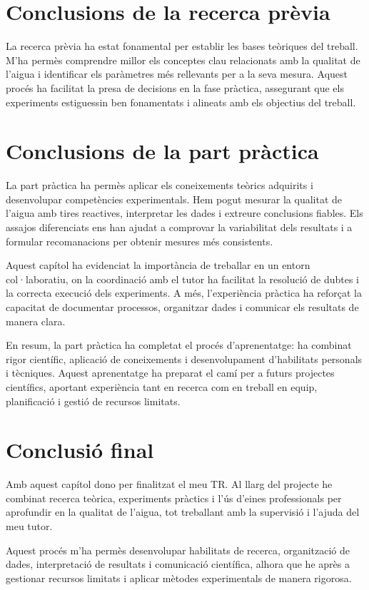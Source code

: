 \section{Conclusions de la recerca prèvia}

La recerca prèvia ha estat fonamental per establir les bases teòriques del treball. M'ha permès comprendre millor els conceptes clau relacionats amb la qualitat de l’aigua i identificar els paràmetres més rellevants per a la seva mesura. Aquest procés ha facilitat la presa de decisions en la fase pràctica, assegurant que els experiments estiguessin ben fonamentats i alineats amb els objectius del treball.



\section{Conclusions de la part pràctica}

La part pràctica ha permès aplicar els coneixements teòrics adquirits i desenvolupar competències experimentals. Hem pogut mesurar la qualitat de l’aigua amb tires reactives, interpretar les dades i extreure conclusions fiables. Els assajos diferenciats ens han ajudat a comprovar la variabilitat dels resultats i a formular recomanacions per obtenir mesures més consistents.

Aquest capítol ha evidenciat la importància de treballar en un entorn col·laboratiu, on la coordinació amb el tutor ha facilitat la resolució de dubtes i la correcta execució dels experiments. A més, l’experiència pràctica ha reforçat la capacitat de documentar processos, organitzar dades i comunicar els resultats de manera clara.

En resum, la part pràctica ha completat el procés d’aprenentatge: ha combinat rigor científic, aplicació de coneixements i desenvolupament d’habilitats personals i tècniques. Aquest aprenentatge ha preparat el camí per a futurs projectes científics, aportant experiència tant en recerca com en treball en equip, planificació i gestió de recursos limitats.

\section{Conclusió final}
Amb aquest capítol dono per finalitzat el meu TR. Al llarg del projecte he combinat recerca teòrica, experiments pràctics i l’ús d’eines professionals per aprofundir en la qualitat de l’aigua, tot treballant amb la supervisió i l’ajuda del meu tutor.

Aquest procés m’ha permès desenvolupar habilitats de recerca, organització de dades, interpretació de resultats i comunicació científica, alhora que he après a gestionar recursos limitats i aplicar mètodes experimentals de manera rigorosa.


